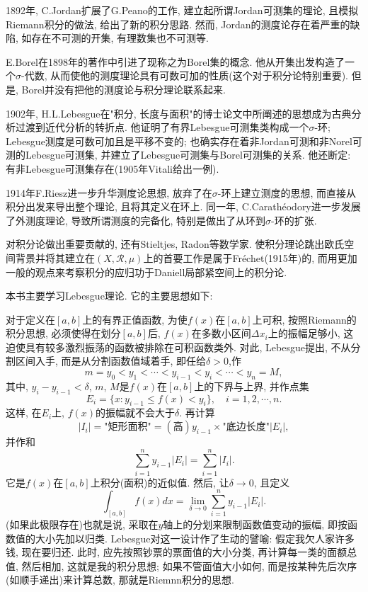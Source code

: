 \documentclass[12pt,a4paper,openany]{book}
\begin{document}
1892年, C.Jordan扩展了G.Peano的工作, 建立起所谓Jordan可测集的理论, 且模拟Riemann积分的做法, 给出了新的积分思路. 然而, Jordan的测度论存在着严重的缺陷, 如存在不可测的开集, 有理数集也不可测等.

E.Borel在1898年的著作中引进了现称之为Borel集的概念. 他从开集出发构造了一个$\sigma$-代数, 从而使他的测度理论具有可数可加的性质(这个对于积分论特别重要). 但是, Borel并没有把他的测度论与积分理论联系起来.

1902年, H.L.Lebesgue在"积分, 长度与面积"的博士论文中所阐述的思想成为古典分析过渡到近代分析的转折点. 他证明了有界Lebesgue可测集类构成一个$\sigma$-环; Lebesgue测度是可数可加且是平移不变的; 也确实存在着非Jordan可测和非Norel可测的Lebesgue可测集, 并建立了Lebesgue可测集与Borel可测集的关系. 他还断定: 有非Lebesgue可测集存在(1905年Vitali给出一例).

1914年F.Riesz进一步升华测度论思想, 放弃了在$\sigma$-环上建立测度的思想, 而直接从积分出发来导出整个理论, 且将其定义在环上. 同一年, C.Carath\'eodory进一步发展了外测度理论, 导致所谓测度的完备化, 特别是做出了从环到$\sigma$-环的扩张.

对积分论做出重要贡献的, 还有Stieltjes, Radon等数学家. 使积分理论跳出欧氏空间背景并将其建立在$(X, \mathscr{R}, \mu)$上的首要工作是属于Fr\'echet(1915年)的, 而用更加一般的观点来考察积分的应归功于Daniell局部紧空间上的积分论.

本书主要学习Lebesgue理论. 它的主要思想如下:

对于定义在$[a, b]$上的有界正值函数, 为使$f(x)$在$[a, b]$上可积, 按照Riemann的积分思想, 必须使得在划分$[a, b]$后, $f(x)$在多数小区间$\Delta{x_i}$上的振幅足够小, 这迫使具有较多激烈振荡的函数被排除在可积函数类外. 对此, Lebesgue提出, 不从分割区间入手, 而是从分割函数值域着手, 即任给$\delta > 0$,作
$$
m = y_0 < y_1 < \cdots < y_{i-1} < y_i < \cdots < y_n = M,
$$
其中, $y_i - y_{i-1} < \delta$, $m$, $M$是$f(x)$在$[a, b]$上的下界与上界, 并作点集
$$
E_i = \{ x: y_{i-1} \le f(x) < y_i\}, \quad i = 1, 2, \cdots, n.
$$
这样, 在$E_i$上, $f(x)$的振幅就不会大于$\delta$. 再计算
$$
|I_i| = \text{"矩形面积"} = (\text{高})y_{i-1} \times \text{"底边长度"}|E_i|,
$$
并作和
$$
\sum_{i=1}^{n}{y_{i-1}|E_i|} = \sum_{i=1}^{n}{|I_i|}.
$$
它是$f(x)$在$[a, b]$上积分(面积)的近似值. 然后, 让$\delta \rightarrow 0$, 且定义
$$
\int_{[a, b]}{f(x)dx} = \lim_{\delta \rightarrow 0}{\sum_{i=1}^{n}{y_{i-1}|E_i|}}.
$$
(如果此极限存在)也就是说, 采取在$y$轴上的分划来限制函数值变动的振幅, 即按函数值的大小先加以归类. Lebesgue对这一设计作了生动的譬喻: 假定我欠人家许多钱, 现在要归还. 此时, 应先按照钞票的票面值的大小分类, 再计算每一类的面额总值, 然后相加, 这就是我的积分思想; 如果不管面值大小如何, 而是按某种先后次序(如顺手递出)来计算总数, 那就是Riemnn积分的思想.
\end{document}

